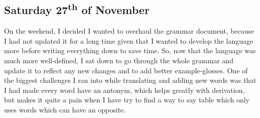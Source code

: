 \documentclass[a4paper,10pt]{article}
\begin{document}
\subsection{Saturday 27\textsuperscript{th} of November}
On the weekend, I decided I wanted to overhaul the grammar document, because I had not
updated it for a long time given that I wanted to develop the language more before writing
everything down to save time. So, now that the language was much more well-defined, I sat
down to go through the whole grammar and update it to reflect any new changes and to add
better example-glosses. One of the biggest challenges I ran into while translating and
adding new words was that I had made every word have an antonym, which helps greatly with
derivation, but makes it quite a pain when I have try to find a way to say table which
only uses words which can have an opposite.
\end{document}
